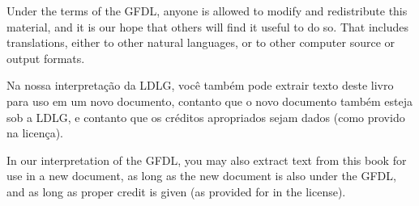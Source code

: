 \medskip\noindent
Under the terms of the GFDL, anyone is allowed to modify and
redistribute this material, and it is our hope that others will find it
useful to do so.  That includes translations, either to other natural
languages, or to other computer source or output formats.

\medskip\noindent
Na nossa interpretação da LDLG, você também pode extrair texto deste 
livro para uso em um novo documento, contanto que o novo documento 
também esteja sob a LDLG, e contanto que os créditos apropriados sejam 
dados (como provido na licença).

\medskip\noindent
In our interpretation of the GFDL, you may also extract text from this
book for use in a new document, as long as the new document is also
under the GFDL, and as long as proper credit is given (as provided for
in the license).


\pagebreak
\byebye
